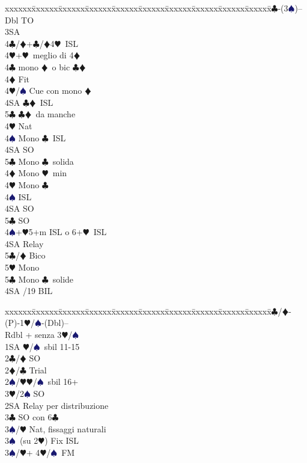 \documentclass[a4paper,italian]{article}
\newcommand{\BC}{\textcolor{OliveGreen}{$\clubsuit$}}
\newcommand{\BD}{\textcolor{RedOrange}{$\vardiamondsuit$}}
\newcommand{\BH}{\textcolor{Red2}{$\varheartsuit${}}}
\newcommand{\BS}{\textcolor{MidnightBlue}{$\spadesuit${}}}
\newenvironment{bidtable}
{\begin{tabbing}

    xxxxxx\=xxxxxx\=xxxxxx\=xxxxxx\=xxxxxx\=xxxxxx\=xxxxxx\=xxxxxx\=xxxxxx\=xxxxxx\=\kill}
{\end{tabbing} }%
\begin{document}
\begin{multicols}{2}
    \columnbreak
    \begin{bidtable}
        1\BC-(3\BS)--\+\\
        Dbl \> TO\+\\
        3SA\+\\
        4\BC/\BD {}+\BC /\BD 4\BH\ ISL\\
        4\BH {}+\BH\ meglio di 4\BD \-\-\\
        4\BC \> mono \BD\ o bic \BC \BD \+\\
        4\BD \> Fit\+\\
        4\BH/\BS \> Cue con mono \BD \\
        4SA \> \BC \BD\ ISL\\
        5\BC \> \BC \BD\ da manche\-\\
        4\BH \> Nat\\
        4\BS \> Mono \BC\ ISL\\
        4SA \> SO\\
        5\BC \> Mono \BC\ solida\-\\
        4\BD \> Mono \BH\ min\\
        4\BH \> Mono \BC\+\\
        4\BS \> ISL\\
        4SA \> SO\\
        5\BC \> SO\-\\
        4\BS {}+\BH 5+m ISL o 6+\BH\ ISL\+\\
        4SA \> Relay\+\\
        5\BC/\BD \> Bico\\
        5\BH \> Mono\-\\
        5\BC \> Mono \BC\ solide\-\\
        4SA /19 BIL
    \end{bidtable}
    \begin{tcolorbox}[colframe=azzurro,title={Sviluppi particolari, validi in situazioni analoghe}]

        \begin{bidtable}
            1\BC/\BD-(P)-1\BH/\BS-(Dbl)--\\
            Rdbl + senza 3\BH/\BS\\
            1SA \BH/\BS\ sbil 11-15\+\\
            2\BC/\BD\> SO\\
            2\BD/\BC\> Trial\-\\
            2\BS/\BH{}\BH/\BS\ sbil 16+\+\\
            3\BH/2\BS\> SO\\
            2SA\> Relay per distribuzione\\
            3\BC\> SO con 6\BC\\
            3\BS/\BH\> Nat, fissaggi naturali\\
            3\BS\ (su 2\BH)\>\> Fix ISL\-\\
            3\BS/\BH {}+ 4\BH/\BS\ FM
        \end{bidtable}


\end{tcolorbox}
\end{multicols}
\end{document}
